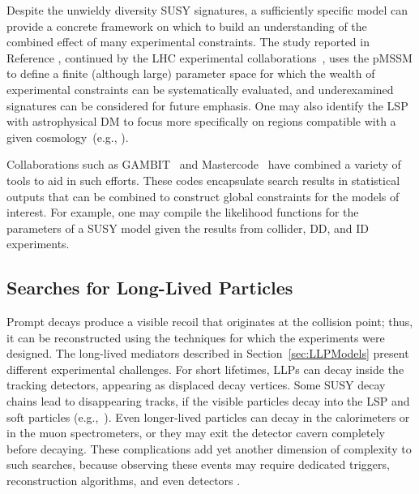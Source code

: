 \documentclass{ar-1col}
\begin{document}
Despite the unwieldy diversity SUSY signatures, a sufficiently
specific model can provide a concrete framework on which to build
an understanding of the combined effect of many experimental
constraints. The study reported in Reference , continued by the LHC
experimental collaborations~\cite{Aad:2015baa, Khachatryan:2016nvf}, uses the
pMSSM to define a finite (although large) parameter space for
which the wealth of experimental constraints can be systematically
evaluated, and underexamined signatures can be considered for future emphasis.
One may also identify the LSP with astrophysical DM
to focus more specifically on regions compatible with a given
cosmology~(e.g., ).

Collaborations such as GAMBIT~\cite{Athron:2017ard} and
Mastercode~\cite{Bagnaschi:2017tru} have combined a variety of
tools to aid in such efforts. These codes encapsulate search
results in statistical outputs that can be combined to construct
global constraints for the models of interest. For example, one
may compile the likelihood functions for the parameters of a SUSY
model given the results from collider, DD, and ID experiments.

\subsection{Searches for Long-Lived Particles}\label{sec:results_LLPSearches}

Prompt decays produce a visible recoil that originates at the collision
point; thus, it can be reconstructed using the techniques for
which the experiments were designed. The long-lived mediators
described in Section~\ref{sec:LLPModels} present different
experimental challenges. For short lifetimes, LLPs can decay inside the tracking detectors, appearing as
displaced decay vertices. Some SUSY decay chains lead to
disappearing tracks, if the visible particles decay into the LSP
and soft particles (e.g.,~).
Even longer-lived particles can decay in the calorimeters or in
the muon spectrometers, or they may exit the detector cavern
completely before decaying. 
These complications add yet another
dimension of complexity to such searches, because observing these
events may require dedicated triggers, reconstruction algorithms,
and even detectors \cite{Ball:2016zrp,Chou:2016lxi}.
\end{document}
